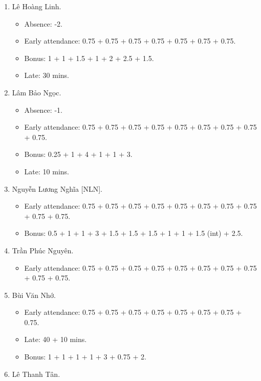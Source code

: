 \documentclass{article}
\begin{document}
\begin{enumerate}
	\begin{itemize}
		\item Early attendance: 0.75 + 0.75 + 0.75 + 0.75 + 0.75 + 0.75 + 0.75 + 0.75 + 0.75.
		\item Bonus: 1 + 0.75 + 1 + 1.
	\end{itemize}
	\item {\sc Lê Hoàng Linh.}
	\begin{itemize}
        \item Absence: -2.
		\item Early attendance: 0.75 + 0.75 + 0.75 + 0.75 + 0.75 + 0.75 + 0.75.
		\item Bonus: 1 + 1 + 1.5 + 1 + 2 + 2.5 + 1.5.
		\item Late: 30 mins.
	\end{itemize}
	\item {\sc Lâm Bảo Ngọc.}
	\begin{itemize}
		\item Absence: -1.
		\item Early attendance: 0.75 + 0.75 + 0.75 + 0.75 + 0.75 + 0.75 + 0.75 + 0.75 + 0.75.
		\item Bonus: 0.25 + 1 + 4 + 1 + 1 + 3.
		\item Late: 10 mins.
	\end{itemize}
	\item {\sc Nguyễn Lương Nghĩa [NLN].}
	\begin{itemize}
		\item Early attendance: 0.75 + 0.75 + 0.75 + 0.75 + 0.75 + 0.75 + 0.75 + 0.75 + 0.75 + 0.75.
		\item Bonus: 0.5 + 1 + 1 + 3 + 1.5 + 1.5 + 1.5 + 1 + 1 + 1.5 (int) + 2.5.
	\end{itemize}
	\item {\sc Trần Phúc Nguyên.}
	\begin{itemize}
		\item Early attendance: 0.75 + 0.75 + 0.75 + 0.75 + 0.75 + 0.75 + 0.75 + 0.75 + 0.75 + 0.75.
	\end{itemize}
	\item {\sc Bùi Văn Nhớ.}
	\begin{itemize}
		\item Early attendance: 0.75 + 0.75 + 0.75 + 0.75 + 0.75 + 0.75 + 0.75 + 0.75.
		\item Late: 40 + 10 mins.
		\item Bonus: 1 + 1 + 1 + 1 + 3 + 0.75 + 2.
	\end{itemize}
	\item {\sc Lê Thanh Tân.}

\end{enumerate}
\end{document}
